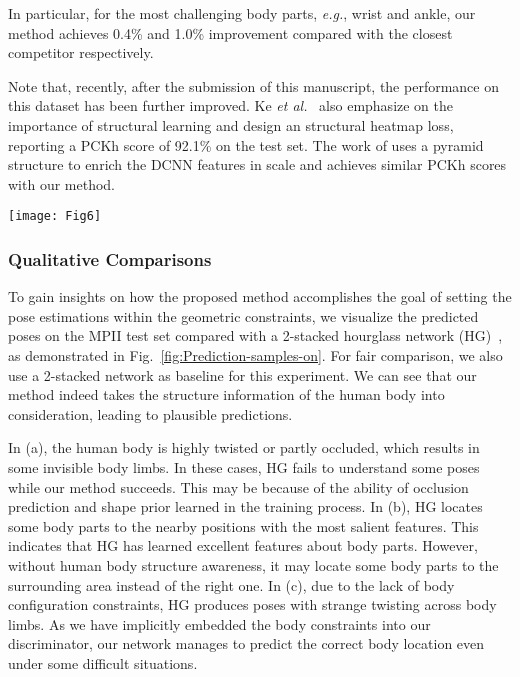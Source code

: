 \documentclass[10pt,journal,compsoc]{IEEEtran}
\begin{document}
In particular, for the most challenging body parts, \emph{e.g.}, wrist and ankle, our method achieves 0.4\% and 1.0\% improvement compared with the closest competitor
%
respectively.

Note that, recently, after the submission of this manuscript,
the performance on this dataset has been further improved.
Ke \emph{et al.}~\cite{ke2018multi} also emphasize on the importance of structural learning and design an structural heatmap loss,  reporting a  PCKh score of 92.1\%  on the test  set. The work of \cite{yang2017learning} uses  a pyramid structure to enrich the DCNN features in scale and achieves similar PCKh scores with our method.





\begin{figure*}[!t]
\centering
\texttt{[image: Fig6]}
%
\caption{Prediction samples on the MPII test set. First row: original images.
Second row: results by stacked hourglass network (HG)~\cite{conf/eccv/NewellYD16}.
Third row: results by our method. (a)-(c) show three different  failure cases  of HG.}
\label{fig:Prediction-samples-on}
\end{figure*}







\subsubsection{Qualitative Comparisons}\label{subsec:Comparison-of-Predicted}

To gain insights on how the proposed method accomplishes the goal of setting the pose estimations  within the geometric constraints, we visualize the predicted poses on the MPII test set compared with a 2-stacked hourglass network (HG)~\cite{conf/eccv/NewellYD16}, as demonstrated in Fig.~\ref{fig:Prediction-samples-on}. For fair comparison, we also use a 2-stacked network as baseline for this experiment.
We can see that our method indeed  takes the structure information of  the human body
into consideration, leading  to plausible  predictions.






In (a), the human body is highly twisted or partly occluded, which results in some invisible body limbs. In these cases, HG fails to understand some poses while our method succeeds. This may be because of the ability of occlusion prediction and shape prior
learned  in the training process. In (b), HG locates some body parts to the nearby positions with the most salient features. This indicates that HG has learned excellent features about body parts. However, without human body structure awareness,
it may locate some body parts to the surrounding area instead of the right one. In (c), due to the
lack of body configuration constraints, HG produces poses with strange twisting across body limbs.
As we have implicitly embedded the body constraints into our discriminator, our network manages to predict
the correct body location even under some difficult situations.
\end{document}
